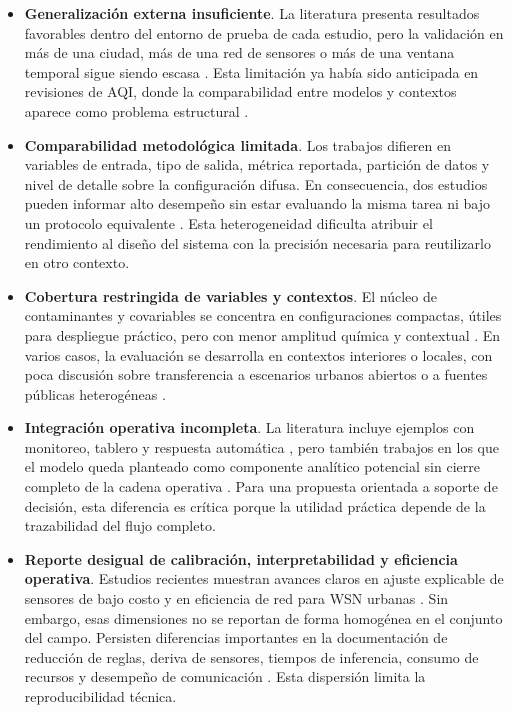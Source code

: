 \begin{itemize}
\item \textbf{Generalización externa insuficiente}. La literatura presenta resultados favorables dentro del entorno de prueba de cada estudio, pero la validación en más de una ciudad, más de una red de sensores o más de una ventana temporal sigue siendo escasa \cite{ART04,A028,A084,A135}. Esta limitación ya había sido anticipada en revisiones de AQI, donde la comparabilidad entre modelos y contextos aparece como problema estructural \cite{ART01,ART02}.
\item \textbf{Comparabilidad metodológica limitada}. Los trabajos difieren en variables de entrada, tipo de salida, métrica reportada, partición de datos y nivel de detalle sobre la configuración difusa. En consecuencia, dos estudios pueden informar alto desempeño sin estar evaluando la misma tarea ni bajo un protocolo equivalente \cite{ART01,ART02,A028,A084,A135}. Esta heterogeneidad dificulta atribuir el rendimiento al diseño del sistema con la precisión necesaria para reutilizarlo en otro contexto.
\item \textbf{Cobertura restringida de variables y contextos}. El núcleo de contaminantes y covariables se concentra en configuraciones compactas, útiles para despliegue práctico, pero con menor amplitud química y contextual \cite{ART06,ART07,A135,A165,A167}. En varios casos, la evaluación se desarrolla en contextos interiores o locales, con poca discusión sobre transferencia a escenarios urbanos abiertos o a fuentes públicas heterogéneas \cite{ART05,A114,A167}.
\item \textbf{Integración operativa incompleta}. La literatura incluye ejemplos con monitoreo, tablero y respuesta automática \cite{ART05,A114,A165,A167}, pero también trabajos en los que el modelo queda planteado como componente analítico potencial sin cierre completo de la cadena operativa \cite{A028,A135}. Para una propuesta orientada a soporte de decisión, esta diferencia es crítica porque la utilidad práctica depende de la trazabilidad del flujo completo.
\item \textbf{Reporte desigual de calibración, interpretabilidad y eficiencia operativa}. Estudios recientes muestran avances claros en ajuste explicable de sensores de bajo costo \cite{A084} y en eficiencia de red para WSN urbanas \cite{ART08}. Sin embargo, esas dimensiones no se reportan de forma homogénea en el conjunto del campo. Persisten diferencias importantes en la documentación de reducción de reglas, deriva de sensores, tiempos de inferencia, consumo de recursos y desempeño de comunicación \cite{A084,ART08}. Esta dispersión limita la reproducibilidad técnica.
\end{itemize}

